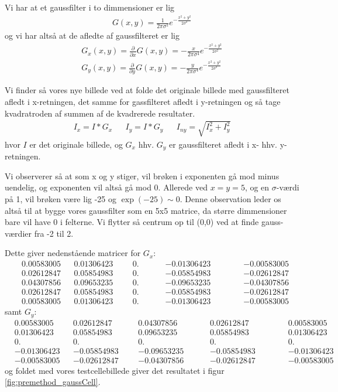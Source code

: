 Vi har at et gaussfilter i to dimmensioner er lig
\begin{align}
	G(x,y) = \frac{1}{2\pi\sigma^2}e^{-\frac{x^2+y^2}{2\sigma^2}}
\end{align}
og vi har altså at de afledte af gaussfilteret er lig
\begin{align}
	G_x(x,y) = \frac{\partial}{\partial x}G(x,y)=-\frac{x}{2\pi\sigma^4}e^{-\frac{x^2+y^2}{2\sigma^2}} \\
	G_y(x,y) = \frac{\partial}{\partial y}G(x,y)=-\frac{y}{2\pi\sigma^4}e^{-\frac{x^2+y^2}{2\sigma^2}}
\end{align}

Vi finder så vores nye billede ved at folde det originale billede med gaussfilteret afledt i x-retningen, det samme for gassfilteret afledt i y-retningen og så tage kvadratroden af summen af de kvadrerede resultater.
\begin{align}
	I_x = I * G_x && I_y = I * G_y && I_{ny} = \sqrt{I_x^2+I_y^2}
\end{align} 
hvor $I$ er det originale billede, og $G_x$ hhv. $G_y$ er gaussfilteret afledt i x- hhv. y-retningen.

Vi observerer så at som x og y stiger, vil brøken i exponenten gå mod minus uendelig, og exponenten vil altså gå mod 0. Allerede ved $x=y=5$, og en $\sigma$-værdi på 1, vil brøken være lig -25 og $\exp(-25)\sim0$. Denne observation leder os altså til at bygge vores gaussfilter som en 5x5 matrice, da større dimmensioner bare vil have 0 i felterne. Vi flytter så centrum op til (0,0) ved at finde gauss-værdier fra -2 til 2.

Dette giver nedenstående matricer for $G_x$:
\begin{align*}
 &0.00583005  &&0.01306423  &&&0. 			&&&&-0.01306423 &&&&&-0.00583005\\
 &0.02612847  &&0.05854983  &&&0. 			&&&&-0.05854983 &&&&&-0.02612847\\
 &0.04307856  &&0.09653235  &&&0. 			&&&&-0.09653235 &&&&&-0.04307856\\
 &0.02612847  &&0.05854983  &&&0. 			&&&&-0.05854983 &&&&&-0.02612847\\
 &0.00583005  &&0.01306423  &&&0. 			&&&&-0.01306423 &&&&&-0.00583005
\end{align*}
samt $G_y$:
\begin{align*}
	&0.00583005  &&0.02612847  &&&0.04307856  	&&&&0.02612847  &&&&&0.00583005\\
	&0.01306423  &&0.05854983  &&&0.09653235  	&&&&0.05854983  &&&&&0.01306423\\
	&0.          &&0.          &&&0.          	&&&&0.          &&&&&0.        \\
	&-0.01306423 &&-0.05854983 &&&-0.09653235 	&&&&-0.05854983 &&&&&-0.01306423\\
	&-0.00583005 &&-0.02612847 &&&-0.04307856 	&&&&-0.02612847 &&&&&-0.00583005
\end{align*}
og foldet med vores testcellebillede giver det resultatet i figur \ref{fig:premethod_gaussCell}.

